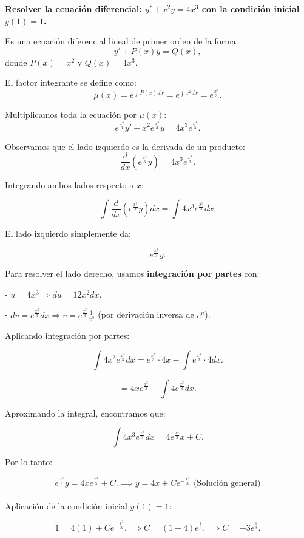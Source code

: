 \documentclass[answers]{exam}
\begin{document}
\begin{questions}

	\question \textbf{Resolver la ecuación diferencial:
		$
			y' + x^2y = 4x^3
		$
		con la condición inicial \( y(1) = 1 \).}


	Es una ecuación diferencial lineal de primer orden de la forma:
	\[
		y' + P(x)y = Q(x),
	\]
	donde \( P(x) = x^2 \) y \( Q(x) = 4x^3 \).

	El factor integrante se define como:
	\[
		\mu(x) = e^{\int P(x)dx} = e^{\int x^2 dx} = e^{\frac{x^3}{3}}.
	\]

	Multiplicamos toda la ecuación por \( \mu(x) \):
	\[
		e^{\frac{x^3}{3}} y' + x^2 e^{\frac{x^3}{3}} y = 4x^3 e^{\frac{x^3}{3}}.
	\]

	Observamos que el lado izquierdo es la derivada de un producto:
	\[
		\frac{d}{dx} \left( e^{\frac{x^3}{3}} y \right) = 4x^3 e^{\frac{x^3}{3}}.
	\]

	Integrando ambos lados respecto a \( x \):

	\[
		\int \frac{d}{dx} \left( e^{\frac{x^3}{3}} y \right) dx = \int 4x^3 e^{\frac{x^3}{3}} dx.
	\]

	El lado izquierdo simplemente da:

	\[
		e^{\frac{x^3}{3}} y.
	\]

	Para resolver el lado derecho, usamos \textbf{integración por partes} con:

	- \( u = 4x^3 \Rightarrow du = 12x^2 dx \).

	- \( dv = e^{\frac{x^3}{3}} dx \Rightarrow v = e^{\frac{x^3}{3}} \frac{1}{x^2} \) (por derivación inversa de \( e^{u} \)).
	\newpage

	Aplicando integración por partes:

	\[
		\int 4x^3 e^{\frac{x^3}{3}} dx = e^{\frac{x^3}{3}} \cdot 4x - \int e^{\frac{x^3}{3}} \cdot 4 dx.
	\]

	\[
		= 4x e^{\frac{x^3}{3}} - \int 4 e^{\frac{x^3}{3}} dx.
	\]

	Aproximando la integral, encontramos que:

	\[
		\int 4x^3 e^{\frac{x^3}{3}} dx = 4 e^{\frac{x^3}{3}} x + C.
	\]

	Por lo tanto:

	\[
		e^{\frac{x^3}{3}} y = 4x e^{\frac{x^3}{3}} + C.
		\implies
		y = 4x + C e^{-\frac{x^3}{3}} \text{ (Solución general)}
	\]\\

	Aplicación de la condición inicial \( y(1) = 1 \):

	\[
		1 = 4(1) + C e^{-\frac{1^3}{3}}.
		\implies
		C = (1 - 4)e^{\frac{1}{3}}.
		\implies
		C = -3e^{\frac{1}{3}}.
	\]


\end{questions}
\end{document}
